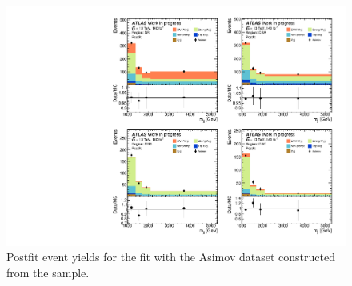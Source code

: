 \begin{figure}[t]
\centering
\includegraphics[width=\textwidth]{plots/diffx/mgasimovtest/mjj_postfit_data_30Nov.pdf}
\caption{Postfit event yields for the fit with the Asimov dataset constructed from the \MADGRAPH \qcdwy sample.\label{fig:vbswy:mgasimovpostfit}}
\end{figure}

